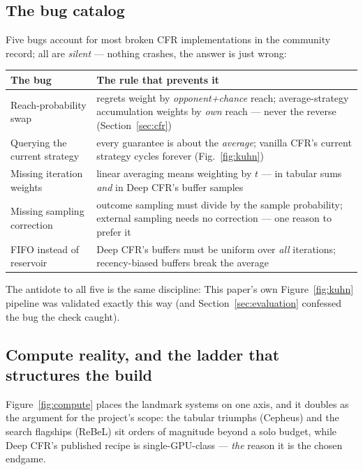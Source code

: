 \subsection*{The bug catalog}

Five bugs account for most broken CFR implementations in the community record; all are \emph{silent} --- nothing crashes, the answer is just wrong:

\begin{center}
\footnotesize
\begin{tabular}{@{}p{1.85in}p{2.75in}@{}}
\toprule
The bug & The rule that prevents it \\
\midrule
Reach-probability swap & regrets weight by \emph{opponent+chance} reach; average-strategy accumulation weights by \emph{own} reach --- never the reverse (Section~\ref{sec:cfr}) \\
Querying the current strategy & every guarantee is about the \emph{average}; vanilla CFR's current strategy cycles forever (Fig.~\ref{fig:kuhn}) \\
Missing iteration weights & linear averaging means weighting by $t$ --- in tabular sums \emph{and} in Deep CFR's buffer samples \\
Missing sampling correction & outcome sampling must divide by the sample probability; external sampling needs no correction --- one reason to prefer it \\
FIFO instead of reservoir & Deep CFR's buffers must be uniform over \emph{all} iterations; recency-biased buffers break the average \\
\bottomrule
\end{tabular}
\end{center}

The antidote to all five is the same discipline:  This paper's own Figure~\ref{fig:kuhn} pipeline was validated exactly this way (and Section~\ref{sec:evaluation} confessed the bug the check caught).

\subsection*{Compute reality, and the ladder that structures the build}

Figure~\ref{fig:compute} places the landmark systems on one axis, and it doubles as the argument for the project's scope: the tabular triumphs (Cepheus) and the search flagships (ReBeL) sit orders of magnitude beyond a solo budget, while Deep CFR's published recipe is single-GPU-class --- \emph{the} reason it is the chosen endgame. 

